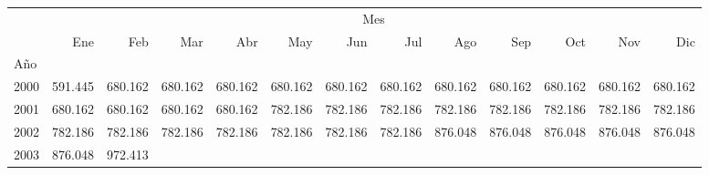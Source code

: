 \begin{tabular}{lllllllllllll}
\cline{1-13}
\multicolumn{1}{c}{} &
  \multicolumn{12}{|c}{Mes} \\
\multicolumn{1}{c}{} &
  \multicolumn{1}{|r}{Ene} &
  \multicolumn{1}{r}{Feb} &
  \multicolumn{1}{r}{Mar} &
  \multicolumn{1}{r}{Abr} &
  \multicolumn{1}{r}{May} &
  \multicolumn{1}{r}{Jun} &
  \multicolumn{1}{r}{Jul} &
  \multicolumn{1}{r}{Ago} &
  \multicolumn{1}{r}{Sep} &
  \multicolumn{1}{r}{Oct} &
  \multicolumn{1}{r}{Nov} &
  \multicolumn{1}{r}{Dic} \\
\cline{1-13}
\multicolumn{1}{l}{Año} &
  \multicolumn{1}{|r}{} &
  \multicolumn{1}{r}{} &
  \multicolumn{1}{r}{} &
  \multicolumn{1}{r}{} &
  \multicolumn{1}{r}{} &
  \multicolumn{1}{r}{} &
  \multicolumn{1}{r}{} &
  \multicolumn{1}{r}{} &
  \multicolumn{1}{r}{} &
  \multicolumn{1}{r}{} &
  \multicolumn{1}{r}{} &
  \multicolumn{1}{r}{} \\
\multicolumn{1}{l}{\hspace{1em}2000} &
  \multicolumn{1}{|r}{591.445} &
  \multicolumn{1}{r}{680.162} &
  \multicolumn{1}{r}{680.162} &
  \multicolumn{1}{r}{680.162} &
  \multicolumn{1}{r}{680.162} &
  \multicolumn{1}{r}{680.162} &
  \multicolumn{1}{r}{680.162} &
  \multicolumn{1}{r}{680.162} &
  \multicolumn{1}{r}{680.162} &
  \multicolumn{1}{r}{680.162} &
  \multicolumn{1}{r}{680.162} &
  \multicolumn{1}{r}{680.162} \\
\multicolumn{1}{l}{\hspace{1em}2001} &
  \multicolumn{1}{|r}{680.162} &
  \multicolumn{1}{r}{680.162} &
  \multicolumn{1}{r}{680.162} &
  \multicolumn{1}{r}{680.162} &
  \multicolumn{1}{r}{782.186} &
  \multicolumn{1}{r}{782.186} &
  \multicolumn{1}{r}{782.186} &
  \multicolumn{1}{r}{782.186} &
  \multicolumn{1}{r}{782.186} &
  \multicolumn{1}{r}{782.186} &
  \multicolumn{1}{r}{782.186} &
  \multicolumn{1}{r}{782.186} \\
\multicolumn{1}{l}{\hspace{1em}2002} &
  \multicolumn{1}{|r}{782.186} &
  \multicolumn{1}{r}{782.186} &
  \multicolumn{1}{r}{782.186} &
  \multicolumn{1}{r}{782.186} &
  \multicolumn{1}{r}{782.186} &
  \multicolumn{1}{r}{782.186} &
  \multicolumn{1}{r}{782.186} &
  \multicolumn{1}{r}{876.048} &
  \multicolumn{1}{r}{876.048} &
  \multicolumn{1}{r}{876.048} &
  \multicolumn{1}{r}{876.048} &
  \multicolumn{1}{r}{876.048} \\
\multicolumn{1}{l}{\hspace{1em}2003} &
  \multicolumn{1}{|r}{876.048} &
  \multicolumn{1}{r}{972.413} &

\end{tabular}
